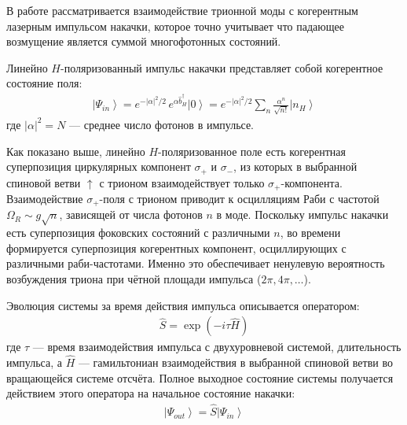 \documentclass[11pt]{article}    %
\numberwithin{equation}{section}
\begin{document}
В работе \cite{krainov2025} рассматривается взаимодействие
трионной моды с когерентным лазерным импульсом накачки,
которое точно учитывает что падающее возмущение является суммой многофотонных состояний.


Линейно $H$-поляризованный импульс накачки представляет собой
когерентное состояние поля:
\begin{gather}
    \left| \Psi_{in} \right\rangle = e^{-|\alpha|^2/2}\,
    e^{\alpha \hat{b}^{\dag}_{H}} \left| 0 \right\rangle
    = e^{-|\alpha|^2/2} \sum_{n} \frac{\alpha^n}{\sqrt{n!}}
    \left| n_H \right\rangle
\end{gather}
где $|\alpha|^2 = N$ --- среднее число фотонов в импульсе.

Как показано выше, линейно $H$-поляризованное поле есть когерентная
суперпозиция циркулярных компонент $\sigma_+$ и $\sigma_-$, из которых
в выбранной спиновой ветви $\uparrow$ с трионом взаимодействует только
$\sigma_+$-компонента. Взаимодействие $\sigma_+$-поля с трионом
приводит к осцилляциям Раби с частотой $\Omega_R \sim g\sqrt{n}$,
зависящей от числа фотонов $n$ в моде. Поскольку импульс накачки есть
суперпозиция фоковских состояний с различными $n$, во времени
формируется суперпозиция когерентных компонент, осциллирующих с
различными раби-частотами. Именно это обеспечивает ненулевую
вероятность возбуждения триона при чётной площади импульса
($2\pi, 4\pi, \ldots$).

Эволюция системы за время действия импульса описывается
оператором:
\begin{gather}
    \hat{S} = \exp\!\left( -i\tau \hat{H} \right)
\end{gather}
где $\tau$ --- время взаимодействия импульса с двухуровневой
системой, длительность импульса, а $\hat{H}$ --- гамильтониан взаимодействия в выбранной
спиновой ветви во вращающейся системе отсчёта. Полное выходное состояние
системы получается действием этого оператора на начальное состояние
накачки:
\begin{gather}
    \left| \Psi_{out} \right\rangle = \hat{S} \left| \Psi_{in} \right\rangle
\end{gather}
\end{document}
